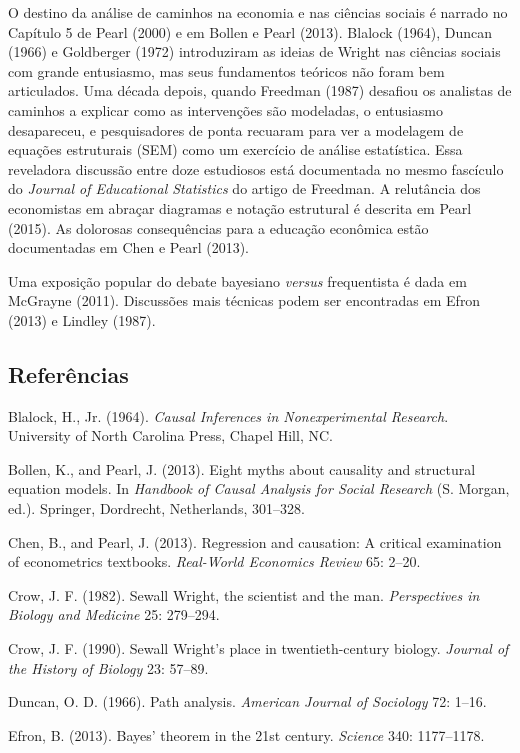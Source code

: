 \documentclass[11pt,a5paper,twoside]{book}
\begin{document}
O destino da análise de caminhos na economia e nas ciências sociais é narrado no Capítulo 5 de Pearl (2000) e em Bollen e Pearl (2013). Blalock (1964), Duncan (1966) e Goldberger (1972) introduziram as ideias de Wright nas ciências sociais com grande entusiasmo, mas seus fundamentos teóricos não foram bem articulados. Uma década depois, quando Freedman (1987) desafiou os analistas de caminhos a explicar como as intervenções são modeladas, o entusiasmo desapareceu, e pesquisadores de ponta recuaram para ver a modelagem de equações estruturais (SEM) como um exercício de análise estatística. Essa reveladora discussão entre doze estudiosos está documentada no mesmo fascículo do \textit{Journal of Educational Statistics} do artigo de Freedman. A relutância dos economistas em abraçar diagramas e notação estrutural é descrita em Pearl (2015). As dolorosas consequências para a educação econômica estão documentadas em Chen e Pearl (2013).

Uma exposição popular do debate bayesiano \textit{versus} frequentista é dada em McGrayne (2011). Discussões mais técnicas podem ser encontradas em Efron (2013) e Lindley (1987).

\subsection{Referências}
Blalock, H., Jr. (1964). \textit{Causal Inferences in Nonexperimental Research}. University of North Carolina Press, Chapel Hill, NC.

Bollen, K., and Pearl, J. (2013). Eight myths about causality and structural equation models. In \textit{Handbook of Causal Analysis for Social Research} (S. Morgan, ed.). Springer, Dordrecht, Netherlands, 301–328.

Chen, B., and Pearl, J. (2013). Regression and causation: A critical examination of econometrics textbooks. \textit{Real-World Economics Review} 65: 2–20.

Crow, J. F. (1982). Sewall Wright, the scientist and the man. \textit{Perspectives in Biology and Medicine} 25: 279–294.

Crow, J. F. (1990). Sewall Wright’s place in twentieth-century biology. \textit{Journal of the History of Biology} 23: 57–89.

Duncan, O. D. (1966). Path analysis. \textit{American Journal of Sociology} 72: 1–16.

Efron, B. (2013). Bayes’ theorem in the 21st century. \textit{Science} 340: 1177–1178.
\end{document}
